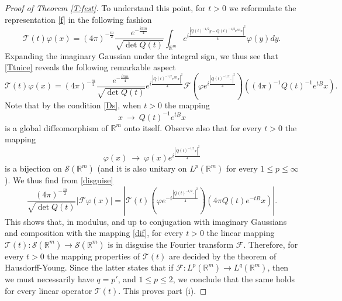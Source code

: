 \documentclass[11pt,a4paper]{amsart}
\def \vf{\varphi}
\def \So {\mathscr{S}(\Rm)}
\newcommand{\Rm}{\mathbb R^m}
\numberwithin{equation}{section}
\numberwithin{equation}{section}
\begin{document}
\begin{proof}[Proof of Theorem \ref{T:fest}]
To understand this point, for $t>0$ we reformulate the representation \eqref{f} in the following fashion
\begin{equation}\label{Ttnice}
\mathcal T(t) \vf(x) = (4\pi
)^{-\frac{m}{2}}  \frac{e^{-\frac{i \pi m}4}}{\sqrt{\det Q(t)}}  \int_{\Rm} e^{i \frac{|Q(t)^{-1/2}y-Q(t)^{-1/2}e^{tB}x|^2}{4}} \vf(y) dy. 
\end{equation}
Expanding the imaginary Gaussian under the integral sign, we thus see that  \eqref{Ttnice} reveals the following remarkable aspect
\begin{equation}\label{disguise}
\mathcal T(t) \vf(x) = (4\pi
)^{-\frac{m}{2}}  \frac{e^{-\frac{i \pi m}4}}{\sqrt{\det Q(t)}} e^{i \frac{|Q(t)^{-1/2} e^{tB} x|^2}{4}}\mathscr F\left(\vf e^{i \frac{|Q(t)^{-1/2} \cdot|^2}{4}}\right)((4\pi)^{-1} Q(t)^{-1} e^{tB} x).
\end{equation}
Note that by the condition \eqref{Ds}, when $t>0$ the mapping
\begin{equation}\label{dif}
x\ \longrightarrow\ Q(t)^{-1} e^{tB} x
\end{equation}
is a global diffeomorphism of $\Rm$ onto itself. Observe also that for every $t>0$ the mapping 
\[
\vf(x)\ \longrightarrow\ \vf(x) e^{i \frac{|Q(t)^{-1/2} x |^2}{4}}
\]
is a bijection on $\mathscr S(\Rm)$ (and it is also unitary on $L^p(\Rm)$ for every $1\le p\le \infty$). We thus find from \eqref{disguise}
\begin{equation*}
\frac{(4\pi
)^{-\frac{m}{2}}}{\sqrt{\det Q(t)}}\left|\mathscr F\vf(x)\right| = \left|\mathcal T(t)\left(\vf e^{-i \frac{|Q(t)^{-1/2} \cdot|^2}{4}}\right)(4\pi Q(t) e^{-tB} x)\right|.
\end{equation*}
This shows that, in modulus, and up to conjugation with imaginary Gaussians and composition with the mapping \eqref{dif}, for every $t>0$ the linear mapping $\mathcal T(t):\So\to \So$ is in disguise the Fourier transform $\mathscr F$. Therefore, for every $t>0$ the mapping properties of $\mathcal T(t)$ are decided by the  theorem of Hausdorff-Young. Since the latter states that if $\mathscr F : L^p(\Rm)\to L^q(\Rm)$, then we must necessarily have $q = p'$, and $1\le p \le 2$, we conclude that the same holds for every linear operator $\mathcal T(t)$. This proves part (i).  


\end{proof}
\end{document}
